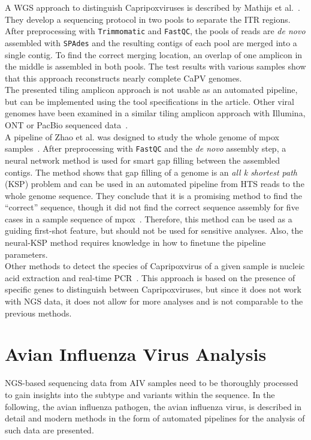 A \ac{WGS} approach to distinguish Capripoxviruses is described by Mathijs et al.~\cite{mathijs2022robust}. They develop a sequencing protocol in two pools to separate the \ac{ITR} regions. After preprocessing with \texttt{Trimmomatic} and \texttt{FastQC}, the pools of reads are \textit{de novo} assembled with \texttt{SPAdes} and the resulting contigs of each pool are merged into a single contig. To find the correct merging location, an overlap of one amplicon in the middle is assembled in both pools. The test results with various samples show that this approach reconstructs nearly complete \acs{CaPV} genomes. \\
The presented tiling amplicon approach is not usable as an automated pipeline, but can be implemented using the tool specifications in the article. Other viral genomes have been examined in a similar tiling amplicon approach with Illumina, \ac{ONT} or PacBio sequenced data~\cite{grubaugh2019amplicon, freed2020rapid, gardner2014multiplex, quick2017multiplex}. \\
A pipeline of Zhao et al. was designed to study the whole genome of mpox samples~\cite{zhao2016finishing}. After preprocessing with \texttt{FastQC} and the \textit{de novo} assembly step, a neural network method is used for smart gap filling between the assembled contigs. The method shows that gap filling of a genome is an \textit{all k shortest path} (KSP) problem and can be used in an automated pipeline from \ac{HTS} reads to the whole genome sequence. They conclude that it is a promising method to find the ``correct'' sequence, though it did not find the correct sequence assembly for five cases in a sample sequence of mpox~\cite{zhao2016finishing}. Therefore, this method can be used as a guiding first-shot feature, but should not be used for sensitive analyses. Also, the neural-\acs{KSP} method requires knowledge in how to finetune the pipeline parameters. \\
Other methods to detect the species of Capripoxvirus of a given sample is nucleic acid extraction and real-time \ac{PCR}~\cite{armson2017detection}. This approach is based on the presence of specific genes to distinguish between Capripoxviruses, but since it does not work with \ac{NGS} data, it does not allow for more analyses and is not comparable to the previous methods.

\section{Avian Influenza Virus Analysis}\label{sec:AIV}
\ac{NGS}-based sequencing data from \ac{AIV} samples need to be thoroughly processed to gain insights into the subtype and variants within the sequence. In the following, the avian influenza pathogen, the avian influenza virus, is described in detail and modern methods in the form of automated pipelines for the analysis of such data are presented.

